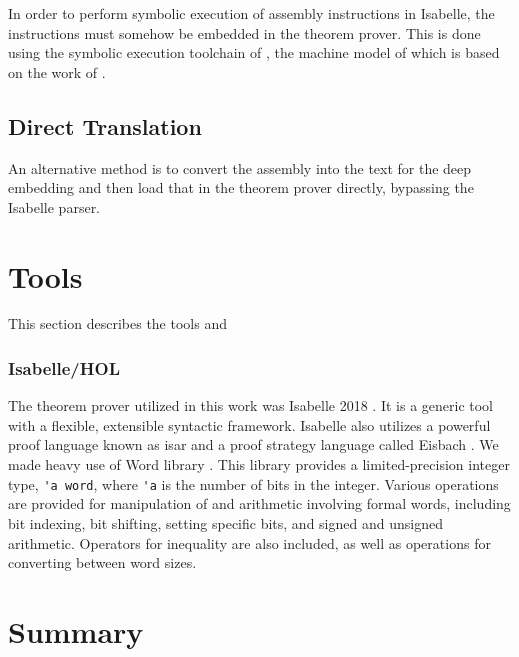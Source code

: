 In order to perform symbolic execution of assembly instructions in Isabelle,
the instructions must somehow be embedded in the theorem prover.
This is done using the symbolic execution toolchain
of \citet{roessle2019},
the machine model of which is based on the work of \citet{heule2016}.%

%
%



\subsection{Direct Translation}\label{sse:direct_translation}
An alternative method is to convert the assembly into the text for the deep embedding
and then load that in the theorem prover directly,
bypassing the Isabelle parser.

\section{Tools}
This section describes the tools and 

\subsubsection{Isabelle/HOL}
The theorem prover utilized in this work was Isabelle 2018 \cite{nipkow2002isabelle}.
It is a generic tool with a flexible, extensible syntactic framework.
Isabelle also utilizes a powerful proof language known as \ac{isar} \cite{wenzel2007isabelle} and a proof strategy language called Eisbach \cite{matichuk2016eisbach}.
We made heavy use of Word library \cite{isabelle-word-session}.
This library provides a limited-precision integer type, \lstinline|'a word|,
where \lstinline|'a| is the number of bits in the integer.
Various operations are provided for manipulation of and arithmetic involving formal words,
including bit indexing, bit shifting, setting specific bits, and signed and unsigned arithmetic.
Operators for inequality are also included,
as well as operations for converting between word sizes.

\section{Summary}
